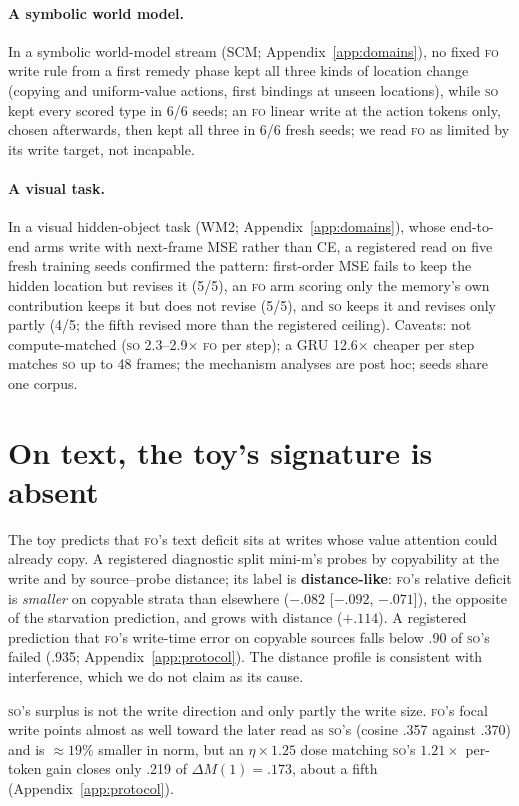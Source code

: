 \documentclass[11pt]{article}
\newcommand{\FO}{\textsc{fo}}
\newcommand{\SO}{\textsc{so}}
\begin{document}
\paragraph{A symbolic world model.}
In a symbolic world-model stream (SCM; Appendix~\ref{app:domains}), no fixed \FO{} write rule from a
first remedy phase kept all three kinds of location change (copying and uniform-value actions,
first bindings at unseen locations), while \SO{} kept every scored type in 6/6 seeds; an \FO{} linear
write at the action tokens only, chosen afterwards, then kept all three in 6/6 fresh seeds; we read
\FO{} as limited by its write target, not incapable.

\paragraph{A visual task.}
In a visual hidden-object task (WM2; Appendix~\ref{app:domains}), whose end-to-end arms write with
next-frame MSE rather than CE, a registered read on five fresh training seeds confirmed the pattern:
first-order MSE fails to keep the hidden location but revises it (5/5), an \FO{} arm scoring only the
memory's own contribution keeps it but does not revise (5/5), and \SO{} keeps it and revises only
partly (4/5; the fifth revised more than the registered ceiling). Caveats: not compute-matched (\SO{}
2.3--2.9$\times$ \FO{} per step); a GRU 12.6$\times$ cheaper per step matches \SO{} up to 48 frames; the
mechanism analyses are post hoc; seeds share one corpus.

\section{On text, the toy's signature is absent}
\label{sec:mechanism}

The toy predicts that \FO's text deficit sits at writes whose value attention could already copy. A
registered diagnostic split mini-m's probes by copyability at the write and by source--probe
distance; its label is \textbf{distance-like}: \FO's relative
deficit is \emph{smaller} on copyable strata than elsewhere ($-.082$ [$-.092$, $-.071$]), the opposite
of the starvation prediction, and grows with distance ($+.114$). A registered prediction that \FO's
write-time error on copyable sources falls below .90 of \SO's failed (.935; Appendix~\ref{app:protocol}).
The distance profile is consistent with interference, which we do not claim as its cause.

\SO's surplus is not the write direction and only partly the write size. \FO's focal write points
almost as well toward the later read as \SO's (cosine .357 against .370) and is $\approx19\%$ smaller
in norm, but an $\eta\times1.25$ dose matching \SO's $1.21\times$ per-token gain closes only .219 of
$\Delta M(1)=.173$, about a fifth (Appendix~\ref{app:protocol}).
\end{document}
